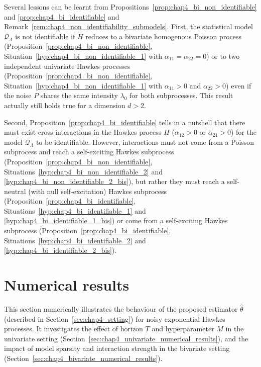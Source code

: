       Several lessons can be learnt from Propositions~\ref{prop:chap4_bi_non_identifiable} and \ref{prop:chap4_bi_identifiable} and Remark~\ref{rem:chap4_non_identifiability_submodels}.
      First, the statistical model $\mathcal Q_\Lambda$ is not identifiable if
      $H$ reduces to a bivariate homogenous Poisson process (Proposition~\ref{prop:chap4_bi_non_identifiable}, Situation~\ref{hyp:chap4_bi_non_identifiable_1} with $\alpha_{11}=\alpha_{22}=0$)
      or to two independent univariate Hawkes processes (Proposition~\ref{prop:chap4_bi_non_identifiable}, Situation~\ref{hyp:chap4_bi_non_identifiable_1} with $\alpha_{11} >0$ and $\alpha_{22}>0$)
      even if the noise $P$ shares the same intensity $\lambda_0$ for both subprocesses.
      This result actually still holds true for a dimension $d > 2$.
      
      Second, Proposition~\ref{prop:chap4_bi_identifiable} tells in a nutshell that there must exist cross-interactions in the Hawkes process $H$ (\ie $\alpha_{12} > 0$ or $\alpha_{21} > 0$) for the model $\mathcal Q_\Lambda$ to be identifiable.
      However,
      interactions must not come from a Poisson subprocess and reach a self-exciting Hawkes subprocess (Proposition~\ref{prop:chap4_bi_non_identifiable}, Situations~\ref{hyp:chap4_bi_non_identifiable_2} and \ref{hyp:chap4_bi_non_identifiable_2_bis}),
      but rather they must reach a self-neutral (\ie with null self-excitation) Hawkes subprocess (Proposition~\ref{prop:chap4_bi_identifiable}, Situations~\ref{hyp:chap4_bi_identifiable_1} and \ref{hyp:chap4_bi_identifiable_1_bis}) 
      or come from a self-exciting Hawkes subprocess
      (Proposition~\ref{prop:chap4_bi_identifiable}, Situations~\ref{hyp:chap4_bi_identifiable_2} and \ref{hyp:chap4_bi_identifiable_2_bis}).


                
        

        
\section{Numerical results}\label{sec:chap4_numerical_results}
        
  This section numerically illustrates the behaviour of the proposed estimator $\hat \theta$ (described in Section~\ref{sec:chap4_setting})
  for noisy exponential Hawkes processes.
  It investigates the effect of horizon $T$ and hyperparameter $M$ in the univariate setting (Section~\ref{sec:chap4_univariate_numerical_results}),
  and the impact of model sparsity and interaction strength in the bivariate setting (Section~\ref{sec:chap4_bivariate_numerical_results}).
  
